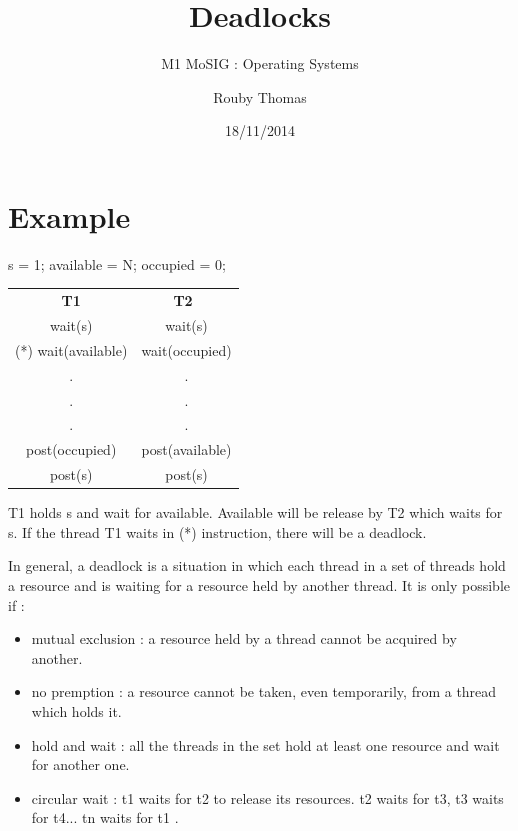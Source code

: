 \documentclass[a4paper,10pt]{article}
\title{\textbf{Deadlocks}}
\subtitle{M1 MoSIG : Operating Systems}
\author{Rouby Thomas}
\date{18/11/2014}
\begin{document}
\maketitle

\section{Example}

  \begin{center}
  s = 1;
  available = N;
  occupied = 0;
  
    \begin{tabular}{cc}
     \textbf{T1} & \textbf{T2} \\
      wait(s) & wait(s)\\
     (*) wait(available) & wait(occupied) \\
      . & . \\
      . & . \\
      . & . \\
      post(occupied) & post(available) \\
      post(s) & post(s) \\
    \end{tabular}
  \end{center}

T1 holds s and wait for available. Available will be release by T2 which waits for s.
If the thread T1 waits in (*) instruction, there will be a deadlock.

In general, a deadlock is a situation in which each thread in a set of threads hold a resource and is waiting for a resource held by another thread.
It is only possible if :
\begin{itemize}
  \item mutual exclusion : a resource held by a thread cannot be acquired by another.
  \item no premption : a resource cannot be taken, even temporarily, from a thread which holds it.
  \item hold and wait : all the threads in the set hold at least one resource and wait for another one.
  \item circular wait : t1 waits for t2 to release its resources. t2 waits for t3, t3 waits for t4... tn waits for t1 .
\end{itemize}
\end{document}
